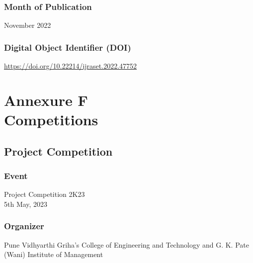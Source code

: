 \documentclass[oneside, 12pt]{book}
\begin{document}
			\subsubsection{Month of Publication}
				November 2022
			\subsubsection{Digital Object Identifier (DOI)}
				\href{https://doi.org/10.22214/ijraset.2022.47752}{https://doi.org/10.22214/ijraset.2022.47752}
			
	\newpage
	\section{Annexure F\\Competitions}
	\newpage
		\subsection{Project Competition}
			\subsubsection{Event}
				Project Competition 2K23\\5th May, 2023
			\subsubsection{Organizer}
				Pune Vidhyarthi Griha’s College of Engineering and Technology and G. K. Pate (Wani) Institute of Management
			
	\newpage
\end{document}
